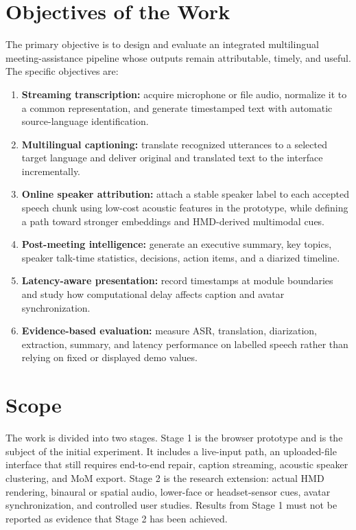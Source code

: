 \documentclass[conference]{IEEEtran}
\begin{document}
\section{Objectives of the Work}
The primary objective is to design and evaluate an integrated multilingual meeting-assistance pipeline whose outputs remain attributable, timely, and useful. The specific objectives are:

\begin{enumerate}
    \item \textbf{Streaming transcription:} acquire microphone or file audio, normalize it to a common representation, and generate timestamped text with automatic source-language identification.
    \item \textbf{Multilingual captioning:} translate recognized utterances to a selected target language and deliver original and translated text to the interface incrementally.
    \item \textbf{Online speaker attribution:} attach a stable speaker label to each accepted speech chunk using low-cost acoustic features in the prototype, while defining a path toward stronger embeddings and HMD-derived multimodal cues.
    \item \textbf{Post-meeting intelligence:} generate an executive summary, key topics, speaker talk-time statistics, decisions, action items, and a diarized timeline.
    \item \textbf{Latency-aware presentation:} record timestamps at module boundaries and study how computational delay affects caption and avatar synchronization.
    \item \textbf{Evidence-based evaluation:} measure ASR, translation, diarization, extraction, summary, and latency performance on labelled speech rather than relying on fixed or displayed demo values.
\end{enumerate}

\section{Scope}
The work is divided into two stages. Stage 1 is the browser prototype and is the subject of the initial experiment. It includes a live-input path, an uploaded-file interface that still requires end-to-end repair, caption streaming, acoustic speaker clustering, and MoM export. Stage 2 is the research extension: actual HMD rendering, binaural or spatial audio, lower-face or headset-sensor cues, avatar synchronization, and controlled user studies. Results from Stage 1 must not be reported as evidence that Stage 2 has been achieved.
\end{document}
